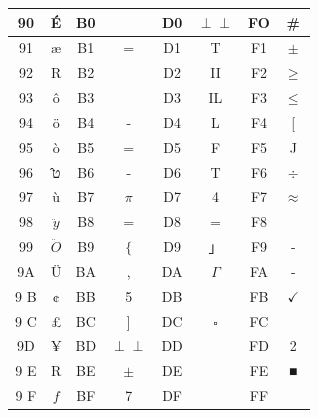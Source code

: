 \documentclass[10pt]{book}
\def\Perp{\perp\!\!\!\perp}
\begin{document}
\begin{center}
\begin{tabular}{|c|c|c|c|c|c|c|c|}
\hline
90 & É & B0 &  & D0 & $\Perp$ & FO & \# \\
\hline
91 & æ & B1 & = & D1 & T & F1 & $\pm$ \\
\hline
92 & R & B2 &  & D2 & II & F2 & $\geq$ \\
\hline
93 & ô & B3 &  & D3 & IL & F3 & $\leq$ \\
\hline
94 & ö & B4 & - & D4 & L & F4 & [ \\
\hline
95 & ò & B5 & $=$ & D5 & F & F5 & J \\
\hline
96 & ט̂ & B6 & - & D6 & T & F6 & $\div$ \\
\hline
97 & ù & B7 & $\pi$ & D7 & 4 & F7 & $\approx$ \\
\hline
98 & $\ddot{y}$ & B8 & $=$ & D8 & = & F8 &  \\
\hline
99 & $\ddot{O}$ & B9 & $\{$ & D9 & 」 & F9 & - \\
\hline
9A & Ü & BA & , & DA & $\Gamma$ & FA & - \\
\hline
9 B & ¢ & BB & 5 & DB &  & FB & $\checkmark$ \\
\hline
9 C & £ & BC & ] & DC & $\square$ & FC &  \\
\hline
9D & ¥ & BD & $\Perp$ & DD &  & FD & 2 \\
\hline
9 E & R & BE & $\pm$ & DE &  & FE & ■ \\
\hline
9 F & $f$ & BF & 7 & DF &  & FF &  \\
\hline
\end{tabular}
\end{center}
\end{document}
